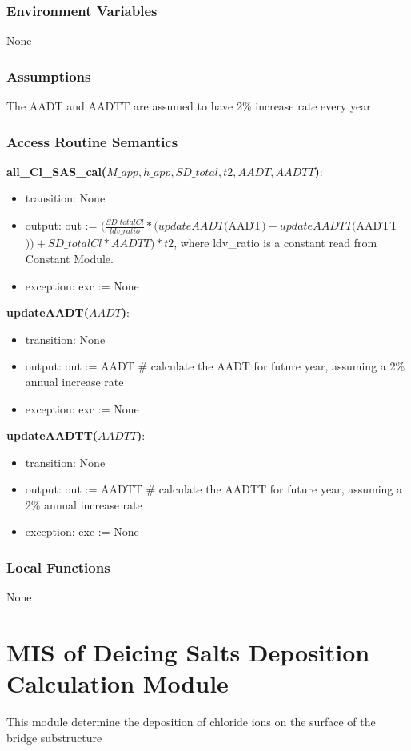 \documentclass[12pt, titlepage]{article}
\begin{document}
\subsubsection{Environment Variables}
None
\subsubsection{Assumptions}
The AADT and AADTT are assumed to have 2\% increase rate every year
\subsubsection{Access Routine Semantics}

\noindent \textbf{all\_Cl\_SAS\_cal($M\_app, h\_app, SD\_total, t2, AADT, AADTT$)}:
\begin{itemize}
\item transition: None
\item output: out := $(\frac{SD\_totalCl}{ldv\_ratio}*(updateAADT($AADT$)-updateAADTT($AADTT$))+ SD\_totalCl* AADTT) * t2$, where ldv\_ratio is a constant read from Constant Module.
\item exception: exc := None
\end{itemize}
\noindent \textbf{updateAADT($AADT$)}:
\begin{itemize}
\item transition: None
\item output: out := AADT \# calculate the AADT for future year, assuming a 2\% annual increase rate 
\item exception: exc := None
\end{itemize}
\noindent \textbf{updateAADTT($AADTT$)}:
\begin{itemize}
\item transition: None
\item output: out := AADTT \# calculate the AADTT for future year, assuming a 2\% annual increase rate 
\item exception: exc := None
\end{itemize}


\subsubsection{Local Functions}
None

\newpage


\section{MIS of Deicing Salts Deposition Calculation Module} \label{deicingSaltsDepositionCalculation Module}
This module determine the deposition of chloride ions on the surface of the bridge substructure
\end{document}
